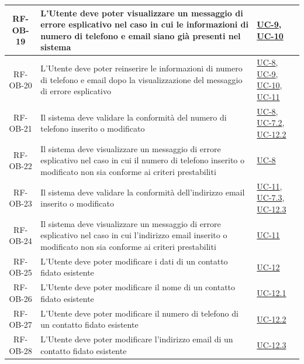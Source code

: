 \documentclass[a4paper,12pt]{article}
\begin{document}
\begin{center}
\begin{longtable}{|c|p{8.5cm}|>{\centering\arraybackslash}p{4cm}|}
RF-OB-19 & L'Utente deve poter visualizzare un messaggio di errore esplicativo nel caso in cui le informazioni di numero di telefono e email siano già presenti nel sistema & \hyperref[subsec:UC-9]{UC-9}, \hyperref[subsec:UC-10]{UC-10} \\
\hline

RF-OB-20 & L'Utente deve poter reinserire le informazioni di numero di telefono e email dopo la visualizzazione del messaggio di errore esplicativo & \hyperref[subsec:UC-8]{UC-8}, \hyperref[subsec:UC-9]{UC-9}, \hyperref[subsec:UC-10]{UC-10}, \hyperref[subsec:UC-11]{UC-11} \\
\hline

RF-OB-21 & Il sistema deve validare la conformità del numero di telefono inserito o modificato & \hyperref[subsec:UC-8]{UC-8}, \hyperref[subsec:UC-7.2]{UC-7.2}, \hyperref[subsec:UC-12.2]{UC-12.2} \\
\hline

RF-OB-22 & Il sistema deve visualizzare un messaggio di errore esplicativo nel caso in cui il numero di telefono inserito o modificato non sia conforme ai criteri prestabiliti & \hyperref[subsec:UC-8]{UC-8} \\
\hline

RF-OB-23 & Il sistema deve validare la conformità dell'indirizzo email inserito o modificato & \hyperref[subsec:UC-11]{UC-11}, \hyperref[subsec:UC-7.3]{UC-7.3}, \hyperref[subsec:UC-12.3]{UC-12.3} \\
\hline

RF-OB-24 & Il sistema deve visualizzare un messaggio di errore esplicativo nel caso in cui l'indirizzo email inserito o modificato non sia conforme ai criteri prestabiliti & \hyperref[subsec:UC-11]{UC-11} \\
\hline

RF-OB-25 & L'Utente deve poter modificare i dati di un contatto fidato esistente & \hyperref[subsec:UC-12]{UC-12} \\
\hline

RF-OB-26 & L'Utente deve poter modificare il nome di un contatto fidato esistente & \hyperref[subsec:UC-12.1]{UC-12.1} \\
\hline

RF-OB-27 & L'Utente deve poter modificare il numero di telefono di un contatto fidato esistente & \hyperref[subsec:UC-12.2]{UC-12.2} \\
\hline

RF-OB-28 & L'Utente deve poter modificare l'indirizzo email di un contatto fidato esistente & \hyperref[subsec:UC-12.3]{UC-12.3} \\
\hline


\end{longtable}
\end{center}
\end{document}
